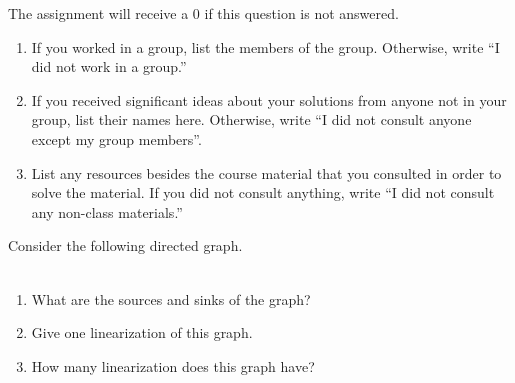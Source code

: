 \documentclass[11pt]{article}
\begin{document}
\begin{qunlist}
\setcounter{sparectr}{-1}

	The assignment will receive a 0 if this question is not answered.
\begin{enumerate}
	\item If you worked in a group, list the members of the group. Otherwise, write ``I did not work in a group.''
	\item If you received significant ideas about your solutions from anyone not in your group, list their names here. Otherwise, write ``I did not consult  anyone except my group members''.
	\item List any resources besides the course material that you consulted in order to solve the material. If you did not consult anything, write ``I did not consult any non-class materials.''
\end{enumerate}


Consider the following directed graph.
\\\\
\begin{enumerate}
    \item  What are the sources and sinks of the graph?
    \item  Give one linearization of this graph.
    \item  How many linearization does this graph have?
\end{enumerate}


\end{qunlist}
\end{document}
